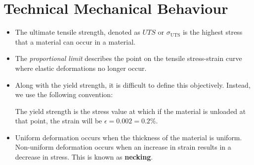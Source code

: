 \section{Technical Mechanical Behaviour}
\begin{itemize}
    \item The ultimate tensile strength, denoted as $UTS$ or $\sigma_\text{UTS}$ is the highest stress that a material can occur in a material.
    \item The \textit{proportional limit} describes the point on the tensile stress-strain curve where elastic deformations no longer occur.
    \item Along with the yield strength, it is difficult to define this objectively. Instead, we use the following convention:
    \begin{definition}
        The yield strength is the stress value at which if the material is unloaded at that point, the strain will be $\epsilon = 0.002 = 0.2\%$.
    \end{definition}
    \item Uniform deformation occurs when the thickness of the material is uniform. Non-uniform deformation occurs when an increase in strain results in a decrease in stress. This is known as \textbf{necking}.
\end{itemize}